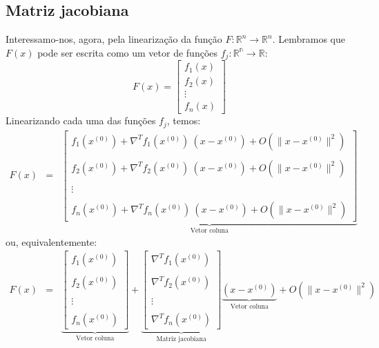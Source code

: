 \subsection{Matriz jacobiana}
Interessamo-nos, agora, pela linearização da função $F:\mathbb{R}^n\to \mathbb{R}^n$. Lembramos que $F(x)$ pode ser escrita como um vetor de funções $f_j:\mathbb{R^n}\to\mathbb{R}$:
\begin{equation*}
  F(x)=\left[\begin{matrix}
      f_1(x)\\
      f_2(x)\\
      \vdots\\
      f_n(x)
    \end{matrix}\right]
\end{equation*}
Linearizando cada uma das funções $f_j$, temos:
\begin{eqnarray*}
F(x)&=&\underbrace{\left[
\begin{array}{c}
f_1\left(x^{(0)}\right)+\nabla^T\! f_1(x^{(0)})\!~\left(x-x^{(0)}\right)   + O(\|x-x^{(0)}\|^2)\\~\\
f_2\left(x^{(0)}\right)+\nabla^T\! f_2(x^{(0)})\!~\left(x-x^{(0)}\right)   + O(\|x-x^{(0)}\|^2)\\~\\
\vdots\\~\\
f_n\left(x^{(0)}\right)+\nabla^T\! f_n(x^{(0)})\!~\left(x-x^{(0)}\right)   + O(\|x-x^{(0)}\|^2)
\end{array}
\right]}_{\text{Vetor coluna}}
\end{eqnarray*}
ou, equivalentemente:
\begin{eqnarray*}
 F(x) &=&\underbrace{\left[
\begin{array}{c}
f_1\left(x^{(0)}\right)\\~\\
f_2\left(x^{(0)}\right)\\~\\
\vdots\\~\\
f_n\left(x^{(0)}\right)
\end{array}
\right]}_{\text{Vetor coluna}}+
\underbrace{\left[
\begin{array}{c}\nabla^T\! f_1(x^{(0)})\\~~\\
\nabla^T\! f_2(x^{(0)})\\~~\\
\vdots\\~~\\
\nabla^T\! f_n(x^{(0)})
\end{array}
\right]}_{\text{Matriz jacobiana}}\underbrace{\left(x-x^{(0)}\right)}_{\text{Vetor coluna}}+O(\|x-x^{(0)}\|^2)
\end{eqnarray*}

